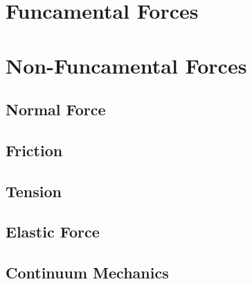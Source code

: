 \section{Funcamental Forces}
\section{Non-Funcamental Forces}
\subsection{Normal Force}
\subsection{Friction}
\subsection{Tension}
\subsection{Elastic Force}
\subsection{Continuum Mechanics}
